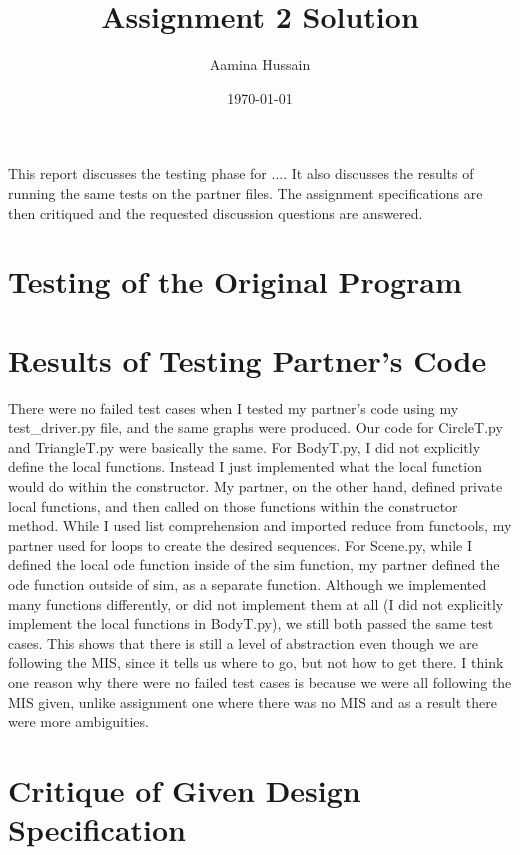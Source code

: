 \documentclass[12pt]{article}
\title{Assignment 2 Solution}
\author{Aamina Hussain}
\date{\today}
\begin{document}
\maketitle

This report discusses the testing phase for .... It also discusses the results
of running the same tests on the partner files. The assignment specifications
are then critiqued and the requested discussion questions are answered.

\section{Testing of the Original Program}


\section{Results of Testing Partner's Code}

There were no failed test cases when I tested my partner’s code using my test\_driver.py
file, and the same graphs were produced. Our code for CircleT.py and TriangleT.py were basically the same. For BodyT.py, I did not explicitly define the local functions. Instead I just implemented what the local function would do within the constructor. My partner, on the other hand, defined private local functions, and then called on those functions within the constructor method. While I used list comprehension and imported reduce from functools, my partner used for loops to create the desired sequences. For Scene.py, while I defined the local ode function inside of the sim function, my partner defined the ode function outside of sim, as a separate function. Although we implemented many functions differently, or did not implement them at all (I did not explicitly implement the local functions in BodyT.py), we still both passed the same test cases. This shows that there is still a level of abstraction even though we are following the MIS, since it tells us where to go, but not how to get there. I think one reason why there were no failed test cases is because we were all following the MIS given, unlike assignment one where there was no MIS and as a result there were more ambiguities.

\section{Critique of Given Design Specification}
\end{document}
